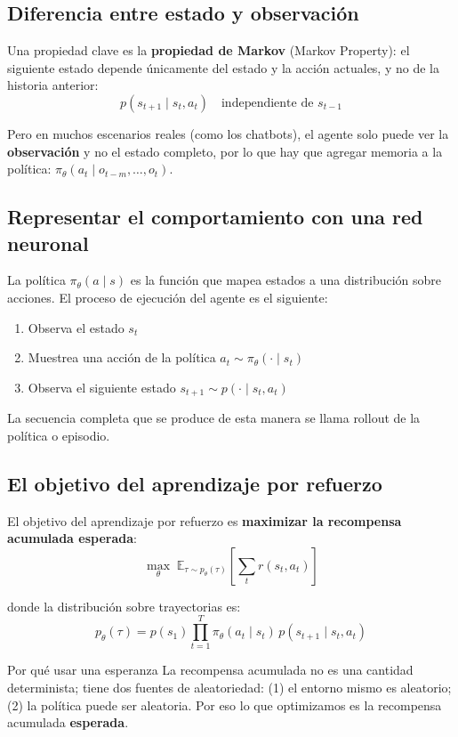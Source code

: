 \documentclass[a4paper]{article}
\begin{document}
\subsection{Diferencia entre estado y observación}

Una propiedad clave es la \textbf{propiedad de Markov} (Markov Property): el siguiente estado depende únicamente del estado y la acción actuales, y no de la historia anterior:
$$p(s_{t+1} \mid s_t, a_t) \quad \text{independiente de } s_{t-1}$$

Pero en muchos escenarios reales (como los chatbots), el agente solo puede ver la \textbf{observación} y no el estado completo, por lo que hay que agregar memoria a la política: $\pi_\theta(a_t \mid o_{t-m}, \ldots, o_t)$.

\subsection{Representar el comportamiento con una red neuronal}

La política $\pi_\theta(a \mid s)$ es la función que mapea estados a una distribución sobre acciones. El proceso de ejecución del agente es el siguiente:
\begin{enumerate}
    \item Observa el estado $s_t$
    \item Muestrea una acción de la política $a_t \sim \pi_\theta(\cdot \mid s_t)$
    \item Observa el siguiente estado $s_{t+1} \sim p(\cdot \mid s_t, a_t)$
\end{enumerate}
La secuencia completa que se produce de esta manera se llama rollout de la política o episodio.

\subsection{El objetivo del aprendizaje por refuerzo}

El objetivo del aprendizaje por refuerzo es \textbf{maximizar la recompensa acumulada esperada}:
$$\max_\theta \; \mathbb{E}_{\tau \sim p_\theta(\tau)} \left[ \sum_{t} r(s_t, a_t) \right]$$

donde la distribución sobre trayectorias es:
$$p_\theta(\tau) = p(s_1) \prod_{t=1}^{T} \pi_\theta(a_t \mid s_t) \, p(s_{t+1} \mid s_t, a_t)$$

\begin{warningbox}{Por qué usar una esperanza}
La recompensa acumulada no es una cantidad determinista; tiene dos fuentes de aleatoriedad: (1) el entorno mismo es aleatorio; (2) la política puede ser aleatoria. Por eso lo que optimizamos es la recompensa acumulada \textbf{esperada}.
\end{warningbox}
\end{document}
